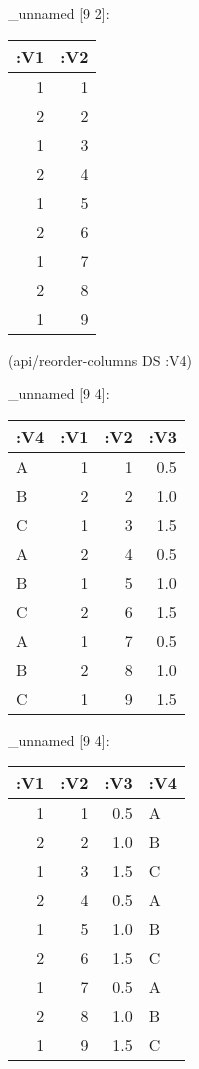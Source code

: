 \documentclass[]{article}
\newenvironment{Shaded}{\begin{snugshade}}{\end{snugshade}}
\newcommand{\KeywordTok}[1]{\textcolor[rgb]{0.13,0.29,0.53}{\textbf{#1}}}
\newcommand{\StringTok}[1]{\textcolor[rgb]{0.31,0.60,0.02}{#1}}
\newcommand{\VariableTok}[1]{\textcolor[rgb]{0.00,0.00,0.00}{#1}}
\newcommand{\AttributeTok}[1]{\textcolor[rgb]{0.77,0.63,0.00}{#1}}
\newcommand{\NormalTok}[1]{#1}
\begin{document}
\_unnamed {[}9 2{]}:

\begin{longtable}[]{@{}rr@{}}
\toprule
:V1 & :V2\tabularnewline
\midrule
\endhead
1 & 1\tabularnewline
2 & 2\tabularnewline
1 & 3\tabularnewline
2 & 4\tabularnewline
1 & 5\tabularnewline
2 & 6\tabularnewline
1 & 7\tabularnewline
2 & 8\tabularnewline
1 & 9\tabularnewline
\bottomrule
\end{longtable}

\begin{Shaded}
\begin{Highlighting}[]
\NormalTok{(api/reorder-columns DS }\AttributeTok{:V4}\NormalTok{)}
\end{Highlighting}
\end{Shaded}

\_unnamed {[}9 4{]}:

\begin{longtable}[]{@{}lrrr@{}}
\toprule
:V4 & :V1 & :V2 & :V3\tabularnewline
\midrule
\endhead
A & 1 & 1 & 0.5\tabularnewline
B & 2 & 2 & 1.0\tabularnewline
C & 1 & 3 & 1.5\tabularnewline
A & 2 & 4 & 0.5\tabularnewline
B & 1 & 5 & 1.0\tabularnewline
C & 2 & 6 & 1.5\tabularnewline
A & 1 & 7 & 0.5\tabularnewline
B & 2 & 8 & 1.0\tabularnewline
C & 1 & 9 & 1.5\tabularnewline
\bottomrule
\end{longtable}

\begin{Shaded}
\end{Shaded}

\_unnamed {[}9 4{]}:

\begin{longtable}[]{@{}rrrl@{}}
\toprule
:V1 & :V2 & :V3 & :V4\tabularnewline
\midrule
\endhead
1 & 1 & 0.5 & A\tabularnewline
2 & 2 & 1.0 & B\tabularnewline
1 & 3 & 1.5 & C\tabularnewline
2 & 4 & 0.5 & A\tabularnewline
1 & 5 & 1.0 & B\tabularnewline
2 & 6 & 1.5 & C\tabularnewline
1 & 7 & 0.5 & A\tabularnewline
2 & 8 & 1.0 & B\tabularnewline
1 & 9 & 1.5 & C\tabularnewline
\bottomrule
\end{longtable}

\begin{Shaded}
\end{Shaded}
\end{document}
